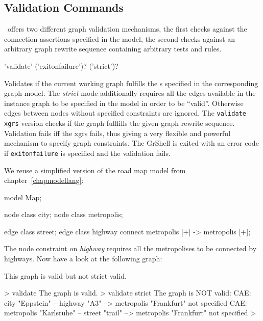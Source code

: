 \subsection{Validation Commands}

\GrG\ offers two different graph validation mechanisms, the first checks against the connection assertions specified in the model, the second checks against an arbitrary graph rewrite sequence containing arbitrary tests and rules.

\begin{rail}
  'validate' ('exitonfailure')? ('strict')?
\end{rail}
Validates if the current working graph fulfills the s specified in the corresponding graph model.
The \emph{strict} mode additionally requires all the edges available in the instance graph to be specified in the model in order to be ``valid''.
Otherwise edges between nodes without specified constraints are ignored.
The \texttt{validate xgrs} version checks if the graph fullfills the given graph rewrite sequence.
Validation fails iff the xgrs fails, thus giving a very flexible and powerful mechanism to specify graph constraints.
The GrShell is exited with an error code if \texttt{exitonfailure} is specified and the validation fails.

\begin{example}
We reuse a simplified version of the road map model from chapter~\ref{chapmodellang}:
\begin{grgen} 
model Map;

node class city;
node class metropolis;

edge class street;
edge class highway
      connect metropolis [+] -> metropolis [+];
\end{grgen}
The node constraint on \emph{highway} requires all the metropolises to be connected by highways. Now have a look at the following graph:
\begin{center}
\end{center}

This graph is valid but not strict valid.
\begin{grshell} 
> validate
The graph is valid.
> validate strict
The graph is NOT valid:
  CAE: city "Eppstein" -- highway "A3" --> metropolis "Frankfurt" not specified
  CAE: metropolis "Karlsruhe" -- street "trail" --> metropolis "Frankfurt" not specified
>
\end{grshell}
\end{example}

